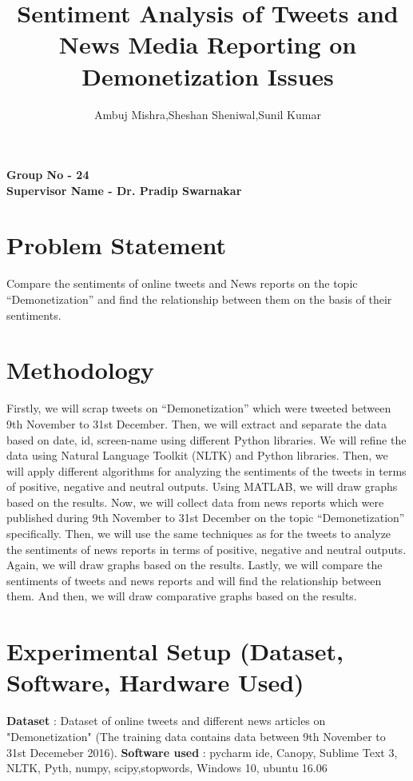 \documentclass[]{article}
\title{Sentiment Analysis of Tweets and News Media Reporting on Demonetization Issues}
\author{Ambuj Mishra,Sheshan Sheniwal,Sunil Kumar}
\begin{document}
\maketitle
\begin{center}
{\large\bf
Group No   -  24\\
\vspace{2ex}  
Supervisor Name   -  Dr. Pradip Swarnakar}  \\



\end{center}


\section{Problem Statement}
Compare the sentiments of online tweets and News reports on the topic “Demonetization” and find the relationship between them on the basis of their sentiments.
\section{Methodology}
Firstly, we will scrap tweets on “Demonetization” which were tweeted between 9th November to 31st December. Then, we will extract and separate the data based on date, id, screen-name using different Python libraries. We will refine the data using Natural Language Toolkit (NLTK) and Python libraries. Then, we will apply different algorithms for analyzing the sentiments of the tweets in terms of positive, negative and neutral outputs. Using MATLAB, we will draw graphs based on the results.
\newline
Now, we will collect data from news reports which were published during 9th November to 31st December on the topic “Demonetization” specifically. Then, we will use the same techniques as for the tweets to analyze the sentiments of news reports in terms of positive, negative and neutral outputs. Again, we will draw graphs based on the results.
\newline
Lastly, we will compare the sentiments of tweets and news reports and will find the relationship between them. And then, we will draw comparative graphs based on the results.
\section{Experimental Setup (Dataset, Software, Hardware Used)}
{\bf Dataset} : Dataset of online tweets and different news articles on "Demonetization" (The training data contains data between 9th November to 31st Decemeber 2016).
\newline
{\bf Software used} : pycharm ide, Canopy, Sublime Text 3, NLTK, Pyth, numpy, scipy,stopwords, Windows 10, ubuntu 16.06
\end{document}
